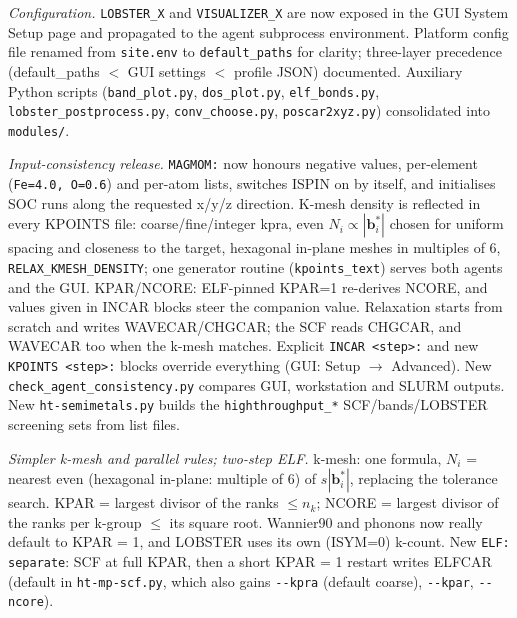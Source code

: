 \documentclass[11pt,a4paper]{scrartcl}
\begin{document}
\begin{description}
    \textit{Configuration.}
    \texttt{LOBSTER\_X} and \texttt{VISUALIZER\_X} are now exposed in the
    GUI System Setup page and propagated to the agent subprocess environment.
    Platform config file renamed from \texttt{site.env} to
    \texttt{default\_paths} for clarity; three-layer precedence
    (default\_paths $<$ GUI settings $<$ profile JSON) documented.
    Auxiliary Python scripts (\texttt{band\_plot.py}, \texttt{dos\_plot.py},
    \texttt{elf\_bonds.py}, \texttt{lobster\_postprocess.py},
    \texttt{conv\_choose.py}, \texttt{poscar2xyz.py}) consolidated into
    \texttt{modules/}.
  \item[\textcolor{mainblue}{v2.0} (2026-09-28)]
    \textit{Input-consistency release.}
    \texttt{MAGMOM:} now honours negative values, per-element
    (\texttt{Fe=4.0, O=0.6}) and per-atom lists, switches ISPIN on by itself,
    and initialises SOC runs along the requested x/y/z direction.
    K-mesh density is reflected in every KPOINTS file: coarse/fine/integer
    kpra, even $N_i \propto |\mathbf{b}_i^*|$ chosen for uniform spacing and
    closeness to the target, hexagonal in-plane meshes in multiples of 6,
    \texttt{RELAX\_KMESH\_DENSITY}; one generator routine
    (\texttt{kpoints\_text}) serves both agents and the GUI.
    KPAR/NCORE: ELF-pinned KPAR=1 re-derives NCORE, and values given in
    INCAR blocks steer the companion value.
    Relaxation starts from scratch and writes WAVECAR/CHGCAR; the SCF reads
    CHGCAR, and WAVECAR too when the k-mesh matches.
    Explicit \texttt{INCAR <step>:} and new \texttt{KPOINTS <step>:} blocks
    override everything (GUI: Setup $\to$ Advanced).
    New \texttt{check\_agent\_consistency.py} compares GUI, workstation and
    SLURM outputs.  New \texttt{ht-semimetals.py} builds the
    \texttt{highthroughput\_*} SCF/bands/LOBSTER screening sets from list files.
  \item[\textcolor{mainblue}{v2.1} (2026-09-30)]
    \textit{Simpler k-mesh and parallel rules; two-step ELF.}
    k-mesh: one formula, $N_i$ = nearest even (hexagonal in-plane: multiple of
    6) of $s|\mathbf{b}_i^*|$, replacing the tolerance search.
    KPAR = largest divisor of the ranks ${}\le n_k$; NCORE = largest divisor of
    the ranks per k-group ${}\le$ its square root.  Wannier90 and phonons now
    really default to KPAR = 1, and LOBSTER uses its own (ISYM=0) k-count.
    New \texttt{ELF: separate}: SCF at full KPAR, then a short KPAR = 1
    restart writes ELFCAR (default in \texttt{ht-mp-scf.py}, which also gains
    \texttt{-{}-kpra} (default coarse), \texttt{-{}-kpar}, \texttt{-{}-ncore}).

\end{description}
\end{document}
